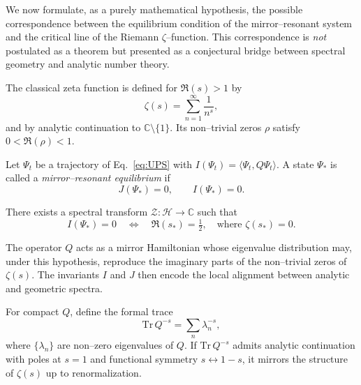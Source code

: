 \noindent
We now formulate, as a purely mathematical hypothesis, the possible correspondence between the equilibrium condition of the mirror–resonant system and the critical line of the Riemann $\zeta$–function.
This correspondence is \emph{not} postulated as a theorem but presented as a conjectural bridge between spectral geometry and analytic number theory.

\begin{definition}
The classical zeta function is defined for $\Re(s)>1$ by
\[
\zeta(s) = \sum_{n=1}^{\infty} \frac{1}{n^s},
\]
and by analytic continuation to $\mathbb{C}\setminus\{1\}$.
Its non–trivial zeros $\rho$ satisfy $0 < \Re(\rho) < 1$.
\end{definition}

\begin{definition}
Let $\Psi_t$ be a trajectory of Eq.~\eqref{eq:UPS} with $I(\Psi_t)=\langle\Psi_t,Q\Psi_t\rangle$.
A state $\Psi_*$ is called a \emph{mirror–resonant equilibrium} if
\[
J(\Psi_*) = 0, \qquad I(\Psi_*) = 0.
\]
\end{definition}

\begin{hypothesis}
There exists a spectral transform $\mathcal{Z}:\mathcal{H}\to\mathbb{C}$ such that
\[
I(\Psi_*) = 0 \quad \Longleftrightarrow \quad \Re(s_*)=\tfrac{1}{2}, \quad \text{where } \zeta(s_*)=0.
\]
\end{hypothesis}

\begin{remark}
The operator $Q$ acts as a mirror Hamiltonian whose eigenvalue distribution may, under this hypothesis,
reproduce the imaginary parts of the non–trivial zeros of $\zeta(s)$.
The invariants $I$ and $J$ then encode the local alignment between analytic and geometric spectra.
\end{remark}

\begin{lemma}
For compact $Q$, define the formal trace
\[
\mathrm{Tr}\,Q^{-s} = \sum_{n} \lambda_n^{-s},
\]
where $\{\lambda_n\}$ are non–zero eigenvalues of $Q$.
If $\mathrm{Tr}\,Q^{-s}$ admits analytic continuation with poles at $s=1$ and functional symmetry $s\leftrightarrow 1-s$, 
it mirrors the structure of $\zeta(s)$ up to renormalization.
\end{lemma}


